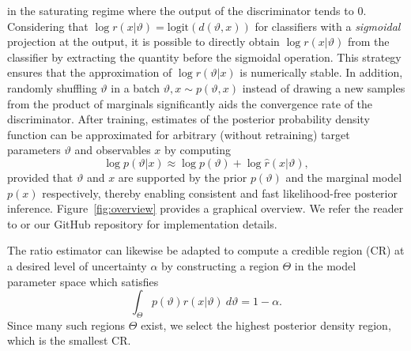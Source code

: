 \documentclass[fleqn,usenatbib]{mnras}
\begin{document}
in the saturating regime where the output of the discriminator tends
to 0. Considering that $\log r(x\vert\vartheta) = \text{logit}(d(\vartheta, x))$ for classifiers
with a \emph{sigmoidal} projection at the output, it is possible to directly obtain
$\log r(x\vert\vartheta)$ from the classifier
by extracting the quantity before the sigmoidal operation.
This strategy ensures that the approximation of $\log r(\vartheta\vert x)$
is numerically stable.
In addition, randomly shuffling $\vartheta$ in a batch
$\vartheta,x\sim p(\vartheta,x)$ instead of drawing a new samples
from the product of marginals significantly aids the convergence rate of the discriminator.
After training, estimates of the posterior probability density
function can be approximated for arbitrary (without retraining)
target parameters $\vartheta$ and observables $x$ by computing
\begin{equation}
  \log p(\vartheta\vert x) \approx \log p(\vartheta) + \log \hat{r}(x\vert\vartheta),
\end{equation}
provided that $\vartheta$ and $x$ are supported
by the prior $p(\vartheta)$ and the marginal model $p(x)$ respectively,
thereby enabling consistent and fast likelihood-free posterior inference.
Figure~\ref{fig:overview} provides a graphical overview.
We refer the reader to \citet{2019arXiv190304057H} or our GitHub repository
for implementation details.

\medskip

The ratio estimator can likewise be adapted to compute a credible region (CR) at a desired level of uncertainty $\alpha$
by constructing a region $\Theta$ in the model parameter space which satisfies
\begin{equation}
  \label{eq:credible_interval}
  \int_\Theta p(\vartheta)r(x\vert\vartheta)~d\vartheta = 1 - \alpha.
\end{equation}
Since many such regions $\Theta$ exist, we select the
highest posterior density region, which is the smallest CR.

\medskip
\end{document}
